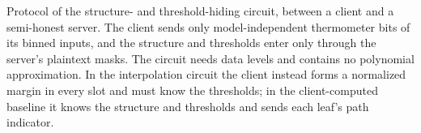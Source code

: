 \begin{\jisawide}[t]
\begin{adjustbox}{max width=\linewidth}
\end{adjustbox}
\caption{Protocol of the structure- and threshold-hiding circuit, between a client and a semi-honest server. The client sends only model-independent thermometer bits of its binned inputs, and the structure and thresholds enter only through the server's plaintext masks. The circuit needs \MOneTMChainLevelsFour{} data levels and contains no polynomial approximation. In the interpolation circuit the client instead forms a normalized margin in every slot and must know the thresholds; in the client-computed baseline it knows the structure and thresholds and sends each leaf's path indicator.}
\label{fig:protocol}
\end{\jisawide}
